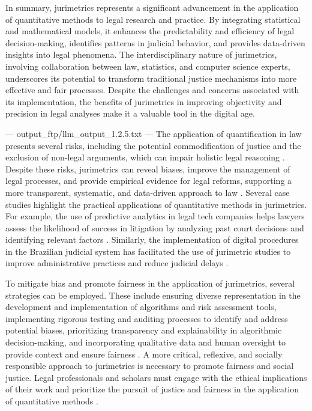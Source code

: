 In summary, jurimetrics represents a significant advancement in the application of quantitative methods to legal research and practice. By integrating statistical and mathematical models, it enhances the predictability and efficiency of legal decision-making, identifies patterns in judicial behavior, and provides data-driven insights into legal phenomena. The interdisciplinary nature of jurimetrics, involving collaboration between law, statistics, and computer science experts, underscores its potential to transform traditional justice mechanisms into more effective and fair processes. Despite the challenges and concerns associated with its implementation, the benefits of jurimetrics in improving objectivity and precision in legal analyses make it a valuable tool in the digital age.


---
output_ftp/llm_output_1.2.5.txt
---
The application of quantification in law presents several risks, including the potential commodification of justice and the exclusion of non-legal arguments, which can impair holistic legal reasoning \cite{nunes2018, ribeiro1998}. Despite these risks, jurimetrics can reveal biases, improve the management of legal processes, and provide empirical evidence for legal reforms, supporting a more transparent, systematic, and data-driven approach to law \cite{ribeiro2021, nunes2018, silva2023}. Several case studies highlight the practical applications of quantitative methods in jurimetrics. For example, the use of predictive analytics in legal tech companies helps lawyers assess the likelihood of success in litigation by analyzing past court decisions and identifying relevant factors \cite{ribeiro2021quantification}. Similarly, the implementation of digital procedures in the Brazilian judicial system has facilitated the use of jurimetric studies to improve administrative practices and reduce judicial delays \cite{103390fi9040068}.

To mitigate bias and promote fairness in the application of jurimetrics, several strategies can be employed. These include ensuring diverse representation in the development and implementation of algorithms and risk assessment tools, implementing rigorous testing and auditing processes to identify and address potential biases, prioritizing transparency and explainability in algorithmic decision-making, and incorporating qualitative data and human oversight to provide context and ensure fairness \cite{10.1590/data.2022.65.3.267,10.1057/s41599-020-0396-5}. A more critical, reflexive, and socially responsible approach to jurimetrics is necessary to promote fairness and social justice. Legal professionals and scholars must engage with the ethical implications of their work and prioritize the pursuit of justice and fairness in the application of quantitative methods \cite{10.1590/data.2022.65.3.267,10.1057/s41599-020-0396-5}.

